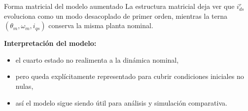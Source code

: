 \documentclass[aspectratio=169,t]{beamer}
\begin{document}
\begin{frame}{Forma matricial del modelo aumentado}
{\small\color{uncGray}La estructura matricial deja ver que $i_{ds}^{r}$ evoluciona como un modo desacoplado de primer orden, mientras la terna $(\theta_m,\omega_m,i_{qs})$ conserva la misma planta nominal.}\par
\vspace{2mm}

\centering
{}

\textbf{Interpretación del modelo:}
\begin{itemize}
  \item el cuarto estado no realimenta a la dinámica nominal,
  \item pero queda explícitamente representado para cubrir condiciones iniciales no nulas,
  \item así el modelo sigue siendo útil para análisis y simulación comparativa.
\end{itemize}
\end{frame}
\end{document}
